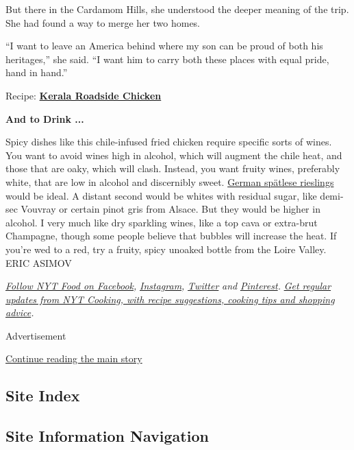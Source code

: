 But there in the Cardamom Hills, she understood the deeper meaning of
the trip. She had found a way to merge her two homes.

``I want to leave an America behind where my son can be proud of both
his heritages,'' she said. ``I want him to carry both these places with
equal pride, hand in hand.''

Recipe:
\href{https://cooking.nytimes3xbfgragh.onion/recipes/1018782-kerala-roadside-chicken}{\textbf{Kerala
Roadside Chicken}}

\textbf{And to Drink ...}

Spicy dishes like this chile-infused fried chicken require specific
sorts of wines. You want to avoid wines high in alcohol, which will
augment the chile heat, and those that are oaky, which will clash.
Instead, you want fruity wines, preferably white, that are low in
alcohol and discernibly sweet.
\href{https://www.nytimes3xbfgragh.onion/2017/06/01/dining/wine-school-riesling-spatlese.html}{German
spätlese rieslings} would be ideal. A distant second would be whites
with residual sugar, like demi-sec Vouvray or certain pinot gris from
Alsace. But they would be higher in alcohol. I very much like dry
sparkling wines, like a top cava or extra-brut Champagne, though some
people believe that bubbles will increase the heat. If you're wed to a
red, try a fruity, spicy unoaked bottle from the Loire Valley. ERIC
ASIMOV

\href{https://www.facebookcorewwwi.onion/nytfood/}{\emph{Follow NYT Food
on Facebook}}\emph{,}
\href{https://instagram.com/nytfood}{\emph{Instagram}}\emph{,}
\href{https://twitter.com/nytfood}{\emph{Twitter}} \emph{and}
\href{https://www.pinterest.com/nytfood/}{\emph{Pinterest}}\emph{.}
\href{https://www.nytimes3xbfgragh.onion/newsletters/cooking}{\emph{Get
regular updates from NYT Cooking, with recipe suggestions, cooking tips
and shopping advice}}\emph{.}

Advertisement

\protect\hyperlink{after-bottom}{Continue reading the main story}

\hypertarget{site-index}{%
\subsection{Site Index}\label{site-index}}

\hypertarget{site-information-navigation}{%
\subsection{Site Information
Navigation}\label{site-information-navigation}}

